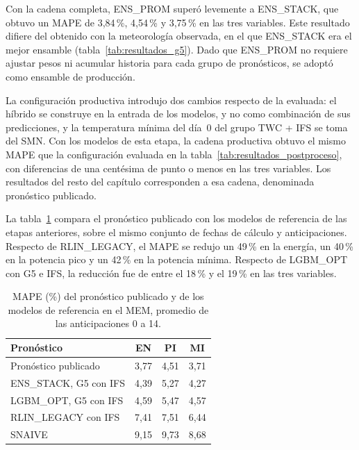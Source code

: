 Con la cadena completa, ENS\_PROM superó levemente a ENS\_STACK, que obtuvo un MAPE de 3,84\,\%, 4,54\,\% y 3,75\,\% en las tres variables. Este resultado difiere del obtenido con la meteorología observada, en el que ENS\_STACK era el mejor ensamble (tabla~\ref{tab:resultados_g5}). Dado que ENS\_PROM no requiere ajustar pesos ni acumular historia para cada grupo de pronósticos, se adoptó como ensamble de producción.

La configuración productiva introdujo dos cambios respecto de la evaluada: el híbrido se construye en la entrada de los modelos, y no como combinación de sus predicciones, y la temperatura mínima del día~0 del grupo TWC + IFS se toma del SMN. Con los modelos de esta etapa, la cadena productiva obtuvo el mismo MAPE que la configuración evaluada en la tabla~\ref{tab:resultados_postproceso}, con diferencias de una centésima de punto o menos en las tres variables. Los resultados del resto del capítulo corresponden a esa cadena, denominada pronóstico publicado.

La tabla~\ref{tab:resultados_final} compara el pronóstico publicado con los modelos de referencia de las etapas anteriores, sobre el mismo conjunto de fechas de cálculo y anticipaciones. Respecto de RLIN\_LEGACY, el MAPE se redujo un 49\,\% en la energía, un 40\,\% en la potencia pico y un 42\,\% en la potencia mínima. Respecto de LGBM\_OPT con G5 e IFS, la reducción fue de entre el 18\,\% y el 19\,\% en las tres variables.

\begin{table}[H]
	\centering
	\caption{MAPE (\%) del pronóstico publicado y de los modelos de referencia en el MEM, promedio de las anticipaciones 0 a 14.}
	\label{tab:resultados_final}
	\small
	\setlength{\tabcolsep}{4pt}
	\renewcommand{\arraystretch}{1.15}
	\begin{tabular*}{\textwidth}{@{\extracolsep{\fill}}lccc@{}}
		\toprule
		\textbf{Pronóstico} & \textbf{EN} & \textbf{PI} & \textbf{MI} \\
		\midrule
		Pronóstico publicado & 3,77 & 4,51 & 3,71 \\
		ENS\_STACK, G5 con IFS & 4,39 & 5,27 & 4,27 \\
		LGBM\_OPT, G5 con IFS & 4,59 & 5,47 & 4,57 \\
		RLIN\_LEGACY con IFS & 7,41 & 7,51 & 6,44 \\
		SNAIVE & 9,15 & 9,73 & 8,68 \\
		\bottomrule
	\end{tabular*}
\end{table}

